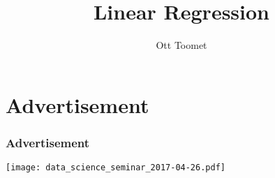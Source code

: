 \documentclass[mathserif, xcolor=table, svgnames]{beamer}
\title{Linear Regression}
\author{Ott Toomet}
\begin{document}
\lstset{language=Python}

\begin{frame}
  \maketitle
\end{frame}

\begin{frame}
  \tableofcontents
\end{frame}

\section{Advertisement}

\begin{frame}
  \frametitle{Advertisement}
  \begin{center}
    \texttt{[image: data\_science\_seminar\_2017-04-26.pdf]}
  \end{center}
\end{frame}
\end{document}
